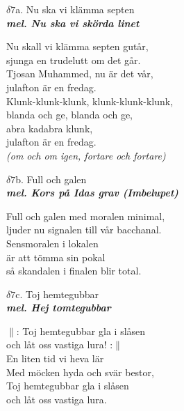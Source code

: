 \documentclass[a6paper,10pt]{article}
\newcommand{\mel}[1]{\small\textbf{\textit{mel. #1 \\}}}
\begin{document}
\setlength{\oddsidemargin}{-0.47in}
\noindent
\begin{center}
\Large $\delta7$a. Nu ska vi klämma septen\\ 
\mel{Nu ska vi skörda linet}
\end{center}
Nu skall vi klämma septen gutår, \\
sjunga en trudelutt om det går. \\
Tjosan Muhammed, nu är det vår, \\
julafton är en fredag. 
\vspace{5pt} \\
Klunk-klunk-klunk, klunk-klunk-klunk, \\
blanda och ge, blanda och ge, \\
abra kadabra klunk, \\
julafton är en fredag. \\
\textit{(om och om igen, fortare och fortare)}
\begin{center}
\Large $\delta7$b. Full och galen\\ 
\mel{Kors på Idas grav (Imbelupet)}
\end{center}
Full och galen med moralen minimal, \\
ljuder nu signalen till vår bacchanal. \\
Sensmoralen i lokalen \\
är att tömma sin pokal \\
så skandalen i finalen blir total.
\begin{center}
\Large $\delta7$c. Toj hemtegubbar\\ 
\mel{Hej tomtegubbar}
\end{center}
$\|$: Toj hemtegubbar gla i slåsen \\
och låt oss vastiga lura! :$\|$
\vspace{5pt} \\
En liten tid vi heva lär \\
Med möcken hyda och svär bestor, \\
Toj hemtegubbar gla i slåsen \\
och låt oss vastiga lura.
\end{document}
